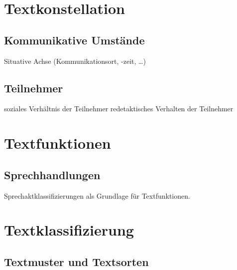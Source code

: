 \documentclass[
  letterpaper,
  DIV=11,
  numbers=noendperiod]{scrreprt}
\begin{document}

\hypertarget{textkonstellation}{%
\chapter{Textkonstellation}\label{textkonstellation}}

\hypertarget{kommunikative-umstuxe4nde}{%
\section{Kommunikative Umstände}\label{kommunikative-umstuxe4nde}}

Situative Achse (Kommunikationsort, -zeit, \ldots)

\hypertarget{teilnehmer}{%
\section{Teilnehmer}\label{teilnehmer}}

soziales Verhältnis der Teilnehmer redetaktisches Verhalten der
Teilnehmer


\hypertarget{textfunktionen}{%
\chapter{Textfunktionen}\label{textfunktionen}}

\hypertarget{sprechhandlungen}{%
\section{Sprechhandlungen}\label{sprechhandlungen}}

Sprechaktklassifizierungen als Grundlage für Textfunktionen.


\hypertarget{textklassifizierung}{%
\chapter{Textklassifizierung}\label{textklassifizierung}}

\hypertarget{textmuster-und-textsorten}{%
\section{Textmuster und Textsorten}\label{textmuster-und-textsorten}}

\end{document}
